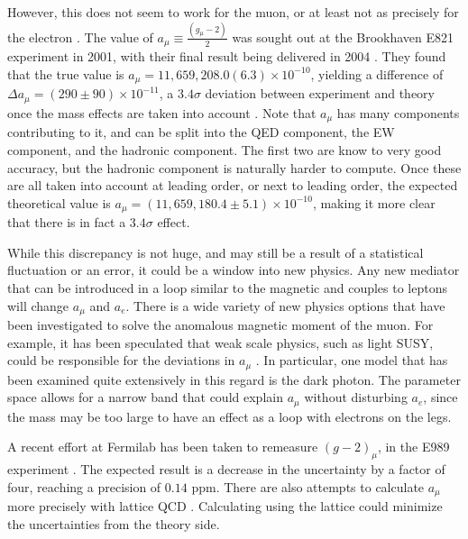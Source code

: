 However, this does not seem to work for the muon, or at least not as precisely for the electron \cite{Jegerlehner:2009ry}.
The value of $a_\mu \equiv \frac{(g_\mu-2)}{2}$ was sought out at the Brookhaven E821 experiment in 2001, with their final result being delivered in 2004 \cite{Hagiwara:2006jt}.
They found that the true value is $a_\mu = 11,659,208.0(6.3)\times 10^{-10}$, yielding a difference of $\Delta a_\mu = (290\pm90)\times 10^{-11}$, a $3.4\sigma$ deviation between experiment and theory once the mass effects are taken into account \cite{Jegerlehner:2009ry}.
Note that $a_\mu$ has many components contributing to it, and can be split into the QED component, the EW component, and the hadronic component.
The first two are know to very good accuracy, but the hadronic component is naturally harder to compute.
Once these are all taken into account at leading order, or next to leading order, the expected theoretical value is $a_\mu = (11,659,180.4 \pm 5.1)\times 10^{-10}$, making it more clear that there is in fact a $3.4\sigma$ effect.

While this discrepancy is not huge, and may still be a result of a statistical fluctuation or an error, it could be a window into new physics.
Any new mediator that can be introduced in a loop similar to the magnetic and couples to leptons will change $a_\mu$ and $a_e$.
There is a wide variety of new physics options that have been investigated to solve the anomalous magnetic moment of the muon.
For example, it has been speculated that weak scale physics, such as light SUSY, could be responsible for the deviations in $a_\mu$ \cite{Czarnecki:2001pv}.
In particular, one model that has been examined quite extensively in this regard is the dark photon.
The parameter space allows for a narrow band that could explain $a_\mu$ without disturbing $a_e$, since the mass may be too large to have an effect as a loop with electrons on the legs.

A recent effort at Fermilab has been taken to remeasure $(g-2)_\mu$, in the E989 experiment \cite{Venanzoni:2014ixa}.
The expected result is a decrease in the uncertainty by a factor of four, reaching a precision of $0.14$ ppm.
There are also attempts to calculate $a_\mu$ more precisely with lattice QCD \cite{Juttner:2009yb, Renner:2010zj, Malak:2015sla}.
Calculating using the lattice could minimize the uncertainties from the theory side.
